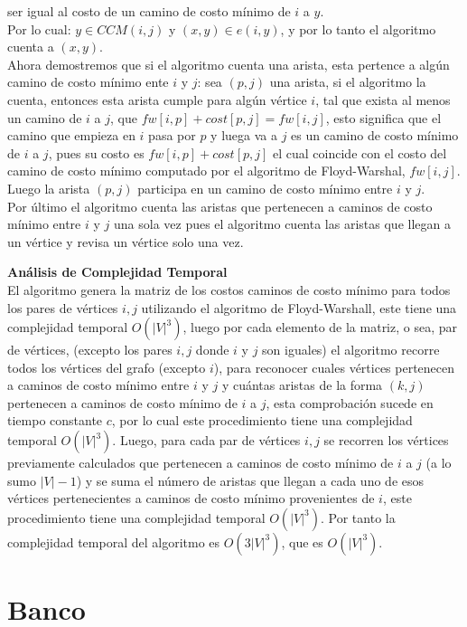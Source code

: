 \documentclass[
10pt, %
a4paper, %
oneside, %
headinclude,footinclude, %
BCOR5mm, %
]{scrartcl}
\begin{document}
ser igual al costo de un camino de costo mínimo de $i$ a $y$.\\
Por lo cual: $y \in CCM(i, j)$ y $(x, y) \in e(i, y)$, y por lo tanto el algoritmo cuenta
a $(x, y)$.\\
Ahora demostremos que si el algoritmo cuenta una arista, esta pertence a
algún camino de costo mínimo ente $i$ y $j$: sea $(p, j)$ una arista, si el algoritmo la cuenta, entonces esta arista cumple
para algún vértice $i$, tal que exista al menos un camino de $i$ a $j$, que $fw[i, p] +
cost[p, j] = fw[i, j]$, esto significa que el camino que empieza en $i$ pasa por
$p$ y luega va a $j$ es un camino de costo mínimo de $i$ a $j$, pues su costo es
$fw[i, p] + cost[p, j]$ el cual coincide con el costo del camino de costo mínimo
computado por el algoritmo de Floyd-Warshal, $fw[i, j]$. Luego la arista $(p, j)$
participa en un camino de costo mínimo entre $i$ y $j$.\\
Por último el algoritmo cuenta las aristas que pertenecen a caminos de costo
mínimo entre $i$ y $j$ una sola vez pues el algoritmo cuenta las aristas que llegan
a un vértice y revisa un vértice solo una vez.


\textbf{Análisis de Complejidad Temporal}\\

El algoritmo genera la matriz de los costos caminos de costo mínimo para
todos los pares de vértices $i, j$ utilizando el algoritmo de Floyd-Warshall,
este tiene una complejidad temporal $O(|V|^3)$, luego por cada elemento de la
matriz, o sea, par de vértices, (excepto los pares $i, j$ donde $i$ y $j$ son iguales) el algoritmo
recorre todos los vértices del grafo (excepto $i$), para reconocer cuales vértices
pertenecen a caminos de costo mínimo entre $i$ y $j$ y cuántas aristas de la forma
$(k, j)$ pertenecen a caminos de costo mínimo de $i$ a $j$, esta comprobación sucede
en tiempo constante $c$, por lo cual este procedimiento tiene una complejidad
temporal $O(|V|^3)$. Luego, para cada par de vértices $i, j$ se recorren los vértices
previamente calculados que pertenecen a caminos de costo mínimo de $i$ a $j$ (a lo
sumo $|V|-1$) y se suma el número de aristas que llegan a cada uno de esos vértices
pertenecientes a caminos de costo mínimo provenientes de $i$, este procedimiento
tiene una complejidad temporal $O(|V|^3)$. Por tanto la complejidad temporal del
algoritmo es $O(3|V|^3)$, que es $O(|V|^3)$.


\section{Banco}
\end{document}
